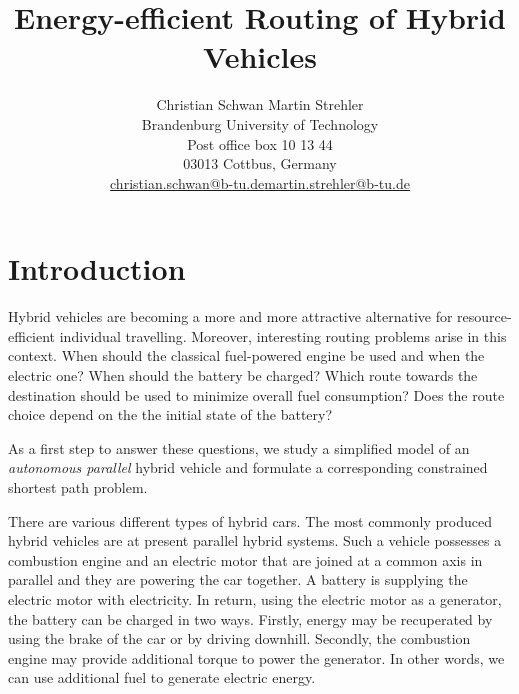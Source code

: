 \documentclass[a4paper]{scrartcl}
\begin{document}
\sloppy

\title{Energy-efficient Routing of Hybrid Vehicles}
\author{Christian Schwan \phantom{and} Martin Strehler\\ \small Brandenburg University of Technology\\ \small Post office box 10 13 44\\ \small 03013 Cottbus, Germany\\ \small \url{christian.schwan@b-tu.de}\quad\url{martin.strehler@b-tu.de}}


\maketitle


\section{Introduction}

Hybrid vehicles are becoming a more and more attractive alternative for resource-efficient individual travelling. Moreover, interesting routing problems arise in this context. When should the classical fuel-powered engine be used and when the electric one? When should the battery be charged? Which route towards the destination should be used to minimize overall fuel consumption? Does the route choice depend on the the initial state of the battery?

As a first step to answer these questions, we study a simplified model of an \textit{autonomous parallel} hybrid vehicle and formulate a corresponding constrained shortest path problem. 

There are various different types of hybrid cars. The most commonly produced hybrid vehicles are at present parallel hybrid systems.
 Such a vehicle possesses a combustion engine and an electric motor that are joined at a common axis in parallel and they are powering the car together. A battery is supplying the electric motor with electricity. 
In return, using the electric motor as a generator, the battery can be charged in two ways. Firstly, energy may be recuperated by using the brake of the car or by driving downhill. Secondly, the combustion engine may provide additional torque to power the generator. In other words, we can use additional fuel to generate electric energy. 
\end{document}
